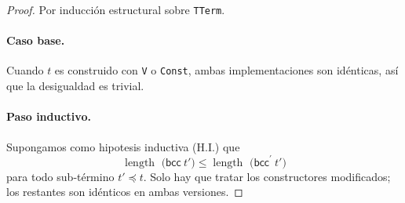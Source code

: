 \documentclass[12pt]{article}
\newcommand{\length}{\operatorname{length\  }}
\newcommand{\bcc}[1]{\mathsf{bcc}\ #1}
\theoremstyle{remark}
\newcommand{\bccp}[1]{\mathsf{bcc}^{\prime}\ #1}
\begin{document}
\begin{proof}
Por inducción estructural sobre \texttt{TTerm}.

\paragraph{Caso base.}
Cuando $t$ es construido con \texttt{V} o \texttt{Const}, ambas
implementaciones son idénticas, así que la desigualdad es trivial.

\paragraph{Paso inductivo.}
Supongamos como hipotesis inductiva (H.I.) que
\[
\length\bigl(\bcc{t'}\bigr)\le\length\bigl(\bccp{t'}\bigr)
\]
para todo sub‑término $t'\preccurlyeq t$.
Solo hay que tratar los constructores modificados; los restantes son
idénticos en ambas versiones.


\end{proof}
\end{document}
